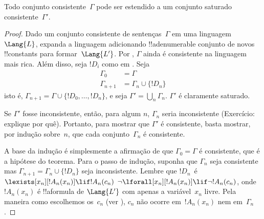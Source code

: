 \documentclass[../../../include/open-logic-section]{subfiles}
\begin{document}
\begin{lem}
Todo conjunto consistente~$\Gamma$ pode ser estendido a um conjunto saturado
consistente~$\Gamma'$.
\end{lem}

\begin{proof}
Dado um conjunto consistente de sentenças~$\Gamma$ em uma linguagem~$\Lang{L}$,
expanda a linguagem adicionando !!a{denumerable} conjunto de novos
!!{constant}s para formar~$\Lang{L'}$.  Por , $\Gamma$
ainda é consistente na linguagem mais rica.  Além disso, seja $!D_i$ como
em .  Seja
\begin{align*}
\Gamma_0 & = \Gamma \\
\Gamma_{n+1} & = \Gamma_n \cup \{!D_n \}
\end{align*}
isto é, $\Gamma_{n+1} = \Gamma \cup \{ !D_0, \dots, !D_n \}$, e seja
$\Gamma' = \bigcup_{n} \Gamma_n$.  $\Gamma'$ é claramente saturado.

Se $\Gamma'$ fosse inconsistente, então, para algum $n$, $\Gamma_n$ seria
inconsistente (Exercício: explique por quê).  Portanto, para mostrar que $\Gamma'$ é
consistente, basta mostrar, por indução sobre~$n$, que cada
conjunto~$\Gamma_n$ é consistente.

A base da indução é simplesmente a afirmação de que $\Gamma_0 = \Gamma$ é
consistente, que é a hipótese do teorema.  Para o passo de indução,
suponha que $\Gamma_{n}$ seja consistente mas $\Gamma_{n+1} =
\Gamma_n \cup \{!D_n\}$ seja inconsistente.  Lembre que $!D_n$~é
{$\lexists[x_{n}][!A_{n}(x_n)] \lif !A_{n}(c_{n})$}
{$\lnot\lforall[x_{n}][!A_{n}(x_n)] \lif \lnot !A_{n}(c_{n})$},
onde $!A_n(x_n)$ é !!a{formula} de $\Lang{L'}$ com apenas a
variável~$x_n$ livre. Pela maneira como escolhemos os~$c_n$ (ver
), $c_n$ não ocorre em~$!A_n(x_n)$ nem
em~$\Gamma_n$.


\end{proof}
\end{document}
